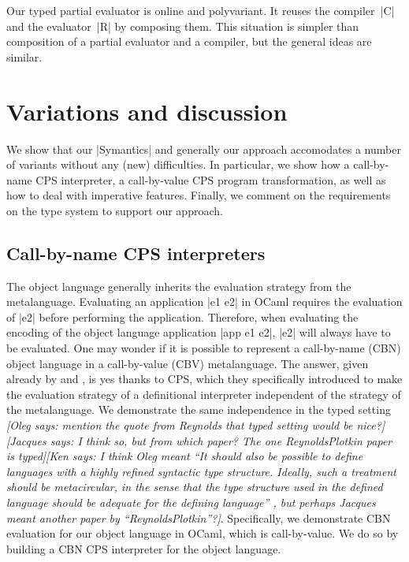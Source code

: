 \documentclass[preprint]{sigplanconf}
\newcommand{\jacques}[1]{{\it [Jacques says: #1]}}
\newcommand{\oleg}[1]{{\it [Oleg says: #1]}}
\newcommand{\ccshan}[1]{{\it [Ken says: #1]}}
\begin{document}
Our typed partial evaluator is online and polyvariant.  It reuses the
compiler~|C| and the evaluator~|R| by composing them.  This situation is
simpler than  composition of a partial
evaluator and a compiler, but the general ideas are similar.

\section{Variations and discussion}\label{discussion}

We show that our |Symantics| and generally our approach accomodates
a number of variants without any (new) difficulties.  In particular,
we show how a call-by-name CPS interpreter, a call-by-value CPS
program transformation, as well as how to deal with imperative features.
Finally, we comment on the requirements on the type system to support 
our approach.

\subsection{Call-by-name CPS interpreters}\label{S:CPS}

The object language generally inherits the evaluation strategy from
the metalanguage. Evaluating an application |e1 e2| in OCaml requires
the evaluation of |e2| before performing the application. Therefore,
when evaluating the encoding of the object language application 
|app e1 e2|, |e2| will always have to be evaluated. One may wonder if it is
possible to represent a call-by-name (CBN) object language in a
call-by-value (CBV) metalanguage. The answer, given already by 
\citet{reynolds-definitional,reynolds-relation} and \citet{PlotkinCBN}, is yes thanks to CPS, which they
specifically introduced 
to make the evaluation strategy of a definitional interpreter
independent of the strategy of the metalanguage. We demonstrate the
same independence in the typed setting \oleg{mention the quote from
Reynolds that typed setting would be nice?}\jacques{I think so, but from
which paper? The one ReynoldsPlotkin paper is typed}\ccshan{I think Oleg
meant ``It should also be possible to define languages with a highly
 refined syntactic type structure. Ideally, such a treatment should be
 metacircular, in
 the sense that the type structure used in the defined language should be adequate for the
 defining language'' \citep{reynolds-definitional}, but perhaps Jacques
 meant another paper by ``ReynoldsPlotkin''?}. Specifically, we
demonstrate CBN evaluation for our object language in OCaml, which is
call-by-value. We do so by building a CBN CPS interpreter for the object
language.
\end{document}
